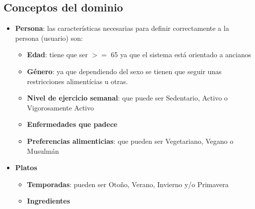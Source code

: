 \documentclass[12]{article}
\begin{document}
\subsection{Conceptos del dominio}
\begin{itemize}
\item \textbf{Persona}: las características necesarias para definir correctamente a la persona (usuario) son: \begin{itemize}
	\item \textbf{Edad}: tiene que ser $>=$ 65 ya que el sistema está orientado a ancianos
	\item \textbf{Género}: ya que dependiendo del sexo se tienen que seguir unas restricciones alimentícias u otras.
	\item \textbf{Nivel de ejercicio semanal}: que puede ser Sedentario, Activo o Vigorosamente Activo
	\item \textbf{Enfermedades que padece}
	\item \textbf{Preferencias alimenticias}: que pueden ser Vegetariano, Vegano o Musulmán
	\end{itemize}
	
	\item \textbf{Platos}
	\begin{itemize}
		\item \textbf{Temporadas}: pueden ser Otoño, Verano, Invierno y/o Primavera
		\item \textbf{Ingredientes}		
	\end{itemize}


\end{itemize}
\end{document}
